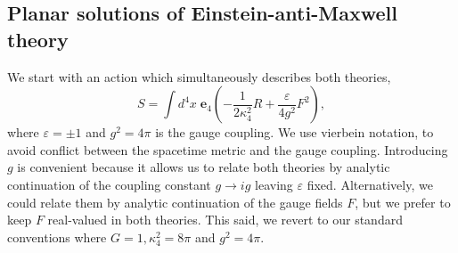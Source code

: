 \subsection{Planar solutions of Einstein-anti-Maxwell theory}

We start with an action which simultaneously describes both theories, 
\begin{equation*}
S = \int d^4 x \; \mathbf{e}_4 \left( - \frac{1}{2\kappa_4^2} R + \frac{\varepsilon}{4g^2} F^2\right),    
\end{equation*}
where $\varepsilon = \pm 1$ and $g^2=4\pi$ is the gauge coupling. We use vierbein notation, to avoid conflict between the spacetime metric and the gauge coupling. Introducing $g$ is convenient because it allows us to relate both theories by analytic continuation of the coupling constant $g \rightarrow ig$ leaving $\varepsilon$ fixed. Alternatively, we could relate them by analytic continuation of the gauge fields $F$, but we prefer to keep $F$ real-valued in both theories. This said, we revert to our standard conventions where $G=1, \kappa^2_4 = 8\pi$ and $g^2=4\pi$. 

